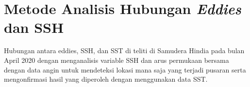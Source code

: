 \section[Metode Analisis Hubungan \textit{Eddies} dan SSH]{Metode Analisis Hubungan \textit{Eddies} dan SSH}
\begin{spacing}{1.5}
	Hubungan antara eddies, SSH, dan SST di teliti di Samudera Hindia pada bulan April 2020 dengan menganalisis variable SSH dan arus permukaan bersama dengan data angin untuk mendeteksi lokasi mana saja yang terjadi pusaran serta mengonfirmasi hasil yang diperoleh dengan menggunakan data SST. 
\end{spacing}
\vspace{-0.5pc}
